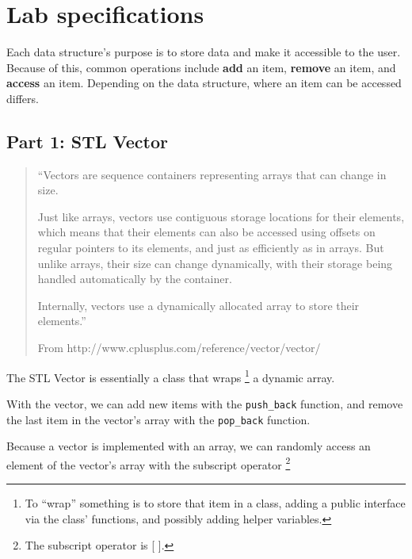     \newpage
    \section{Lab specifications}

        Each data structure's purpose is to store data and make it accessible
        to the user. Because of this, common operations include \textbf{add} an item,
        \textbf{remove} an item, and \textbf{access} an item. Depending on the
        data structure, where an item can be accessed differs.


        \subsection{Part 1: STL Vector}

        \begin{mdframed}
            \begin{quote}
                ``Vectors are sequence containers representing arrays that can change in size.

                Just like arrays, vectors use contiguous storage locations for their elements, which means that their elements can also be accessed using offsets on regular pointers to its elements, and just as efficiently as in arrays. But unlike arrays, their size can change dynamically, with their storage being handled automatically by the container.

                Internally, vectors use a dynamically allocated array to store their elements.''

                \footnotesize{From http://www.cplusplus.com/reference/vector/vector/}
            \end{quote}
        \end{mdframed}

        The STL Vector is essentially a class that wraps
        \footnote{To ``wrap'' something is to store that item in a class, adding a public interface via the class' functions, and possibly adding helper variables.}
        a dynamic array.

        With the vector, we can add new items with the \texttt{push\_back} function,
        and remove the last item in the vector's array with the \texttt{pop\_back} function.

        Because a vector is implemented with an array, we can randomly access an element of the vector's array with the subscript operator
        \footnote{The subscript operator is [ ].}

